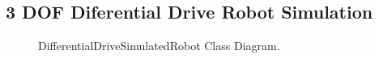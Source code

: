 \documentclass[letterpaper,10pt,english]{sphinxmanual}
\begin{document}
\begin{fulllineitems}
\begin{fulllineitems}
\end{fulllineitems}


\end{fulllineitems}



\subsection{3 DOF Diferential Drive Robot Simulation}
\label{\detokenize{robot_simulation:dof-diferential-drive-robot-simulation}}
\begin{figure}[htbp]
\centering
\capstart

\noindent{}
\caption{DifferentialDriveSimulatedRobot Class Diagram.}\label{\detokenize{robot_simulation:id2}}\end{figure}
\end{document}

